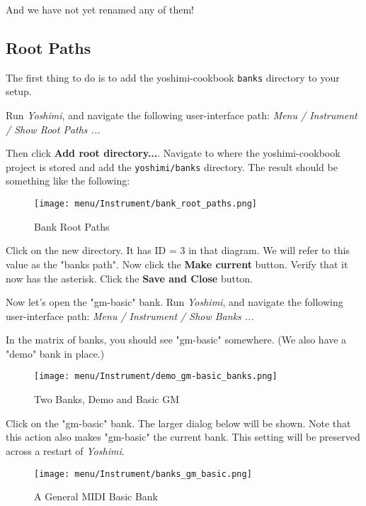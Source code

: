    And we have not yet renamed any of them!

\subsection{Root Paths}
\label{subsec:cookbook_banks_root_paths}

   The first thing to do is to add the yoshimi-cookbook \texttt{banks}
   directory to your setup.

   Run \textsl{Yoshimi}, and navigate the following user-interface path:
   \textsl{Menu / Instrument / Show Root Paths ...}

   Then click \textbf{Add root directory...}.  Navigate to where the
   yoshimi-cookbook project is stored and add the \texttt{yoshimi/banks}
   directory.  The result should be something like the following:

\begin{figure}[H]
   \centering 
   \texttt{[image: menu/Instrument/bank\_root\_paths.png]}
   \caption{Bank Root Paths}
   \label{fig:cookbook_bank_root_paths}
\end{figure}

   Click on the new directory.
   It has ID = 3 in that diagram.  We will refer to this value as
   the "banks path".
   Now click the \textbf{Make current} button.
   Verify that it now has the asterisk. 
   Click the \textbf{Save and Close} button.

   Now let's open the "gm-basic" bank.
   Run \textsl{Yoshimi}, and navigate the following user-interface path:
   \textsl{Menu / Instrument / Show Banks ...}

   In the matrix of banks, you should see "gm-basic" somewhere.
   (We also have a "demo" bank in place.)

\begin{figure}[H]
   \centering 
   \texttt{[image: menu/Instrument/demo\_gm-basic\_banks.png]}
   \caption{Two Banks, Demo and Basic GM}
   \label{fig:cookbook_bank_demo_gm_basic}
\end{figure}
   
   Click on the "gm-basic" bank.  The larger dialog below will be shown.
   Note that this action also makes "gm-basic" the current bank.
   This setting will be preserved across a restart of \textsl{Yoshimi}.

\begin{figure}[H]
   \centering 
   \texttt{[image: menu/Instrument/banks\_gm\_basic.png]}
   \caption{A General MIDI Basic Bank}
   \label{fig:cookbook_bank_basic_bank}
\end{figure}

